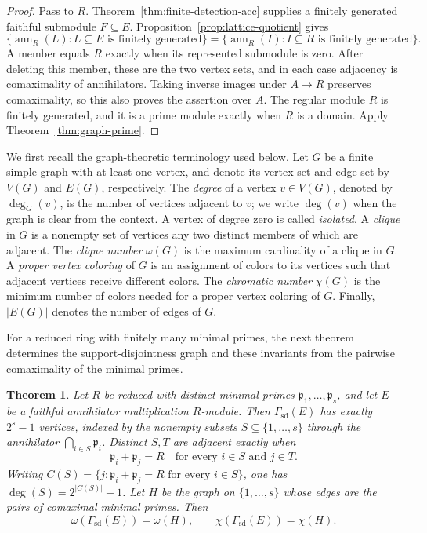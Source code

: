 \documentclass[11pt]{amsart}
\theoremstyle{plain}
\newtheorem{theorem}{Theorem}[section]
\theoremstyle{definition}
\theoremstyle{remark}
\newcommand{\ann}{\operatorname{ann}}
\newcommand{\GammaSD}{\Gamma_{\mathrm{sd}}}
\numberwithin{equation}{section}
\begin{document}
\begin{proof}
Pass to $R$. Theorem~\ref{thm:finite-detection-acc} supplies a finitely
generated faithful submodule $F\subseteq E$.
Proposition~\ref{prop:lattice-quotient} gives
\[
 \{\ann_R(L):L\subseteq E\text{ is finitely generated}\}
 =\{\ann_R(I):I\subseteq R\text{ is finitely generated}\}.
\]
A member equals $R$ exactly when its represented submodule is zero.
After deleting this member, these are the two vertex sets, and in each
case adjacency is comaximality of annihilators.
Taking inverse images under $A\to R$ preserves comaximality, so this
also proves the assertion over $A$.
The regular module $R$ is finitely generated, and it is a prime module
exactly when $R$ is a domain. Apply Theorem~\ref{thm:graph-prime}.
\end{proof}

We first recall the graph-theoretic terminology used below.
Let $G$ be a finite simple graph with at least one vertex, and denote
its vertex set and edge set by $V(G)$ and $E(G)$, respectively.
The \emph{degree} of a vertex $v\in V(G)$, denoted by $\deg_G(v)$,
is the number of vertices adjacent to $v$; we write $\deg(v)$ when
the graph is clear from the context. A vertex of degree zero is
called \emph{isolated}.
A \emph{clique} in $G$ is a nonempty set of vertices any two distinct
members of which are adjacent. The \emph{clique number} $\omega(G)$
is the maximum cardinality of a clique in $G$.
A \emph{proper vertex coloring} of $G$ is an assignment of colors
to its vertices such that adjacent vertices receive different colors.
The \emph{chromatic number} $\chi(G)$ is the minimum number of colors
needed for a proper vertex coloring of $G$.
Finally, $|E(G)|$ denotes the number of edges of $G$.

For a reduced ring with finitely many minimal primes, the next theorem
determines the support-disjointness graph and these invariants from
the pairwise comaximality of the minimal primes.

\begin{theorem}\label{thm:finite-min-graph}
Let $R$ be reduced with distinct minimal primes
$\mathfrak p_1,\ldots,\mathfrak p_s$, and let $E$ be a faithful
annihilator multiplication $R$-module. Then $\GammaSD(E)$ has exactly
$2^s-1$ vertices, indexed by the nonempty subsets $S\subseteq\{1,\ldots,s\}$
through the annihilator $\bigcap_{i\in S}\mathfrak p_i$.
Distinct $S,T$ are adjacent exactly when
\[
 \mathfrak p_i+\mathfrak p_j=R
 \quad\text{for every }i\in S\text{ and }j\in T.
\]
Writing
$C(S)=\{j:\mathfrak p_i+\mathfrak p_j=R\text{ for every }i\in S\}$,
one has $\deg(S)=2^{|C(S)|}-1$.
Let $H$ be the graph on $\{1,\ldots,s\}$ whose edges are the pairs
of comaximal minimal primes. Then
\[
 \omega(\GammaSD(E))=\omega(H),\qquad
 \chi(\GammaSD(E))=\chi(H).
\]
\end{theorem}
\end{document}
